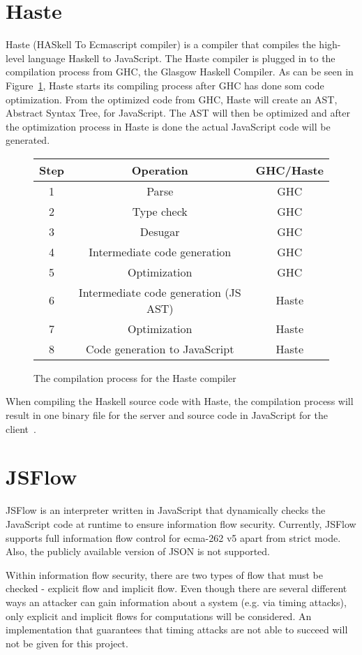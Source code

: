 \section{Haste}
Haste (HASkell To Ecmascript compiler) is a compiler that compiles the high-level language Haskell to JavaScript. The Haste compiler is plugged in to the compilation process from GHC, the Glasgow Haskell Compiler. As can be seen in Figure~\ref{fig:system}, Haste starts its compiling process after GHC has done som code optimization. From the optimized code from GHC, Haste will create an AST, Abstract Syntax Tree, for JavaScript. The AST will then be optimized and after the optimization process in Haste is done the actual JavaScript code will be generated.
\begin{figure}[h]
  \begin{tabular}{|c|c|c|}
    \hline
    Step & Operation & GHC/Haste \\
    \hline
    1 & Parse & GHC \\
    2 & Type check & GHC \\
    3 & Desugar & GHC \\
    4 & Intermediate code generation & GHC \\
    5 & Optimization & GHC \\
    6 & Intermediate code generation (JS AST) & Haste \\
    7 & Optimization & Haste \\
    8 & Code generation to JavaScript & Haste \\
    \hline
  \end{tabular}
  \caption{The compilation process for the Haste compiler}
  \label{fig:system}
\end{figure}

When compiling the Haskell source code with Haste, the compilation process will result in one binary file for the server and source code in JavaScript for the client~\cite{haste-symposium}.

\section{JSFlow}
JSFlow is an interpreter written in JavaScript that dynamically checks the JavaScript code at runtime to ensure information flow security. Currently, JSFlow supports full information flow control for ecma-262 v5 apart from strict mode. Also, the publicly available version of JSON is not supported.

Within information flow security, there are two types of flow that must be checked - explicit flow and implicit flow. Even though there are several different ways an attacker can gain information about a system (e.g. via timing attacks), only explicit and implicit flows for computations will be considered. An implementation that guarantees that timing attacks are not able to succeed will not be given for this project.
